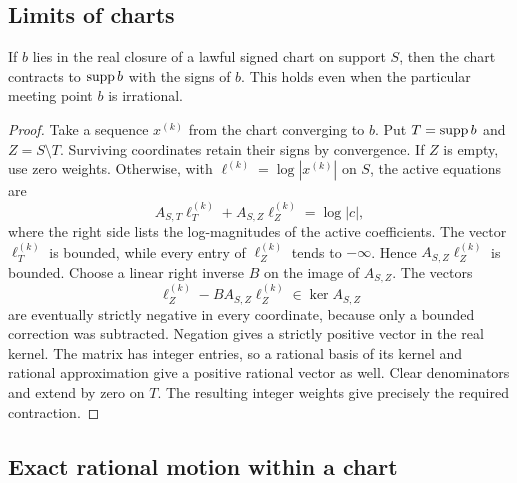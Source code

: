\subsection{Limits of charts}\label{sec:chart-limits}

\begin{lemma}\label{lem:limit}
If \(b\) lies in the real closure of a lawful signed chart on support
\(S\), then the chart contracts to \(\operatorname{supp} b\) with the signs of \(b\).
This holds even when the particular meeting point \(b\) is irrational.
\end{lemma}
\begin{proof}
Take a sequence \(x^{(k)}\) from the chart converging to \(b\).
Put \(T=\operatorname{supp} b\) and \(Z=S\setminus T\).
Surviving coordinates retain their signs by convergence.
If \(Z\) is empty, use zero weights. Otherwise, with
\(\ell^{(k)}=\log|x^{(k)}|\) on \(S\), the active equations are
\[
 A_{S,T}\ell^{(k)}_T+A_{S,Z}\ell^{(k)}_Z=\log|c|,
\]
where the right side lists the log-magnitudes of the active coefficients.
The vector \(\ell^{(k)}_T\) is bounded, while every entry of
\(\ell^{(k)}_Z\) tends to \(-\infty\). Hence
\(A_{S,Z}\ell^{(k)}_Z\) is bounded. Choose a linear right inverse
\(B\) on the image of \(A_{S,Z}\). The vectors
\[
 \ell^{(k)}_Z-B A_{S,Z}\ell^{(k)}_Z\in\ker A_{S,Z}
\]
are eventually strictly negative in every coordinate, because only a
bounded correction was subtracted. Negation gives a strictly positive
vector in the real kernel. The matrix has integer entries, so a rational
basis of its kernel and rational approximation give a positive rational
vector as well. Clear denominators and extend by zero on \(T\).
The resulting integer weights give precisely the required contraction.
\end{proof}

\subsection{Exact rational motion within a chart}\label{sec:rational-chart}

